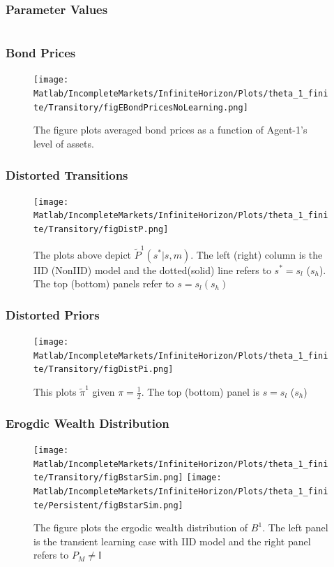 \documentclass{beamer}
\theoremstyle{definition}
\begin{document}
\begin{frame}
\frametitle{Parameter Values}
\[\]
\end{frame}
\begin{frame}
\frametitle{Bond Prices}
\begin{figure}[htbp]
\centering
	  \texttt{[image: Matlab/IncompleteMarkets/InfiniteHorizon/Plots/theta\_1\_finite/Transitory/figEBondPricesNoLearning.png]}

	\caption{\small{The figure plots averaged bond prices as a function of Agent-1's level of assets.} }
 
	\label{fig:figEBondPricesNoLearning}
\end{figure} 
\end{frame}


\begin{frame}
\frametitle{Distorted Transitions}
\begin{figure}[htbp]
\centering
	  \texttt{[image: Matlab/IncompleteMarkets/InfiniteHorizon/Plots/theta\_1\_finite/Transitory/figDistP.png]}

	\caption{ The plots above depict $\tilde{P}^1(s^*|s,m)$. The left (right) column is the IID (NonIID) model and the dotted(solid) line refers to $s^*=s_l$ ($s_h$). The top (bottom) panels refer to $s=s_l (s_h)$}
 
	\label{fig:DistP}
\end{figure} 
\end{frame}



\begin{frame}
\frametitle{Distorted Priors}
\begin{figure}[htbp]
\centering
	  \texttt{[image: Matlab/IncompleteMarkets/InfiniteHorizon/Plots/theta\_1\_finite/Transitory/figDistPi.png]}

	\caption{ \small{This plots $\tilde{\pi}^1$ given $\pi=\frac{1}{2}$. The top (bottom) panel is $s=s_l$ ($s_h$) }}
 
	\label{fig:figDistPi}
\end{figure} 
\end{frame}


\begin{frame}
\frametitle{Erogdic Wealth Distribution}
\begin{figure}[htbp]
\texttt{[image: Matlab/IncompleteMarkets/InfiniteHorizon/Plots/theta\_1\_finite/Transitory/figBstarSim.png]}
	  \hfill \texttt{[image: Matlab/IncompleteMarkets/InfiniteHorizon/Plots/theta\_1\_finite/Persistent/figBstarSim.png]}

\caption{\small {The figure plots the ergodic wealth distribution of $B^1$. The left panel is the transient learning case with IID model and the right panel refers to $P_M\neq\mathbb{I}$}}
\end{figure} 
\end{frame}
\end{document}
